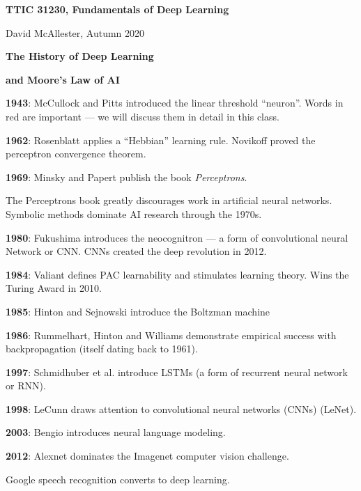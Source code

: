 




{\Huge
  \centerline{\bf TTIC 31230,  Fundamentals of Deep Learning}
  \vfill
  \centerline{David McAllester, Autumn 2020}
  \vfill
  \centerline{\bf The History of Deep Learning}
  \vfill
  \centerline{\bf  and Moore's Law of AI}

\vfill
\vfill



{\bf 1943}: McCullock and Pitts introduced the {\color{red} linear threshold ``neuron''}. Words in red are important --- we will discuss them in detail in this class.

\vfill
{\bf 1962}: Rosenblatt applies a ``Hebbian'' learning rule.  Novikoff proved the perceptron convergence theorem.

\vfill
{\bf 1969}: Minsky and Papert publish the book {\it Perceptrons}.

\vfill
The Perceptrons book greatly discourages work in artificial neural networks.  Symbolic methods dominate AI research through the 1970s.


{\bf 1980}: Fukushima introduces the neocognitron --- a form of {\color{red} convolutional neural Network or CNN}.  CNNs created the deep revolution in 2012.

\vfill
{\bf 1984}: Valiant defines PAC learnability and stimulates learning theory. Wins the Turing Award in 2010.

\vfill
{\bf 1985}: Hinton and Sejnowski introduce the Boltzman machine

\vfill
{\bf 1986}: Rummelhart, Hinton and Williams demonstrate empirical success with {\color{red} backpropagation} (itself dating back to 1961).


{\bf 1997}: Schmidhuber et al. introduce LSTMs (a form of {\color{red} recurrent neural network or RNN}).

\vfill
{\bf 1998}: LeCunn draws attention to convolutional neural networks (CNNs) (LeNet).

\vfill
{\bf 2003}: Bengio introduces {\color{red} neural language modeling}.


{\bf 2012}: Alexnet dominates the Imagenet computer vision challenge.

\vfill
Google speech recognition converts to deep learning.

}
